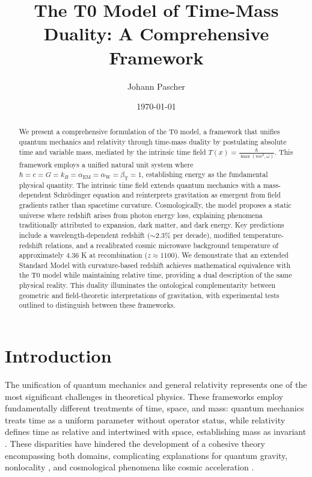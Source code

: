\documentclass[aps,prl,twocolumn,superscriptaddress,nofootinbib]{revtex4-2}
\newcommand{\Tfield}{T(x)}
\newcommand{\alphaEM}{\alpha_{\text{EM}}}
\newcommand{\alphaW}{\alpha_{\text{W}}}
\newcommand{\betaT}{\beta_{\text{T}}}
\begin{document}
	
	\title{The T0 Model of Time-Mass Duality: A Comprehensive Framework}
	
	\author{Johann Pascher}
	
	\date{\today}
	
	\begin{abstract}
		We present a comprehensive formulation of the T0 model, a framework that unifies quantum mechanics and relativity through time-mass duality by postulating absolute time and variable mass, mediated by the intrinsic time field $\Tfield = \frac{\hbar}{\max(mc^2, \omega)}$. This framework employs a unified natural unit system where $\hbar = c = G = k_B = \alphaEM = \alphaW = \betaT = 1$, establishing energy as the fundamental physical quantity. The intrinsic time field extends quantum mechanics with a mass-dependent Schrödinger equation and reinterprets gravitation as emergent from field gradients rather than spacetime curvature. Cosmologically, the model proposes a static universe where redshift arises from photon energy loss, explaining phenomena traditionally attributed to expansion, dark matter, and dark energy. Key predictions include a wavelength-dependent redshift ($\sim$2.3\% per decade), modified temperature-redshift relations, and a recalibrated cosmic microwave background temperature of approximately 4.36 K at recombination ($z \approx 1100$). We demonstrate that an extended Standard Model with curvature-based redshift achieves mathematical equivalence with the T0 model while maintaining relative time, providing a dual description of the same physical reality. This duality illuminates the ontological complementarity between geometric and field-theoretic interpretations of gravitation, with experimental tests outlined to distinguish between these frameworks.
	\end{abstract}
	
	\maketitle
	
	\section{Introduction}
	\label{sec:introduction}
	
	The unification of quantum mechanics and general relativity represents one of the most significant challenges in theoretical physics. These frameworks employ fundamentally different treatments of time, space, and mass: quantum mechanics treats time as a uniform parameter without operator status, while relativity defines time as relative and intertwined with space, establishing mass as invariant \cite{einstein1905, einstein1915, schrodinger1926}. These disparities have hindered the development of a cohesive theory encompassing both domains, complicating explanations for quantum gravity, nonlocality \cite{bell1964}, and cosmological phenomena like cosmic acceleration \cite{Riess1998, Perlmutter1999}.
	
\end{document}
